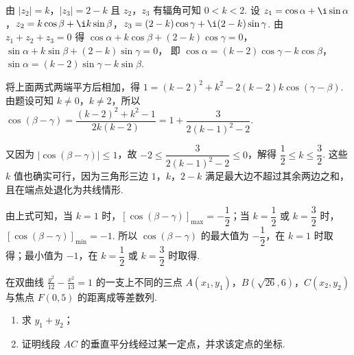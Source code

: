 \begin{solution}
由 \(|z_2|=k\)，\(|z_3|=2-k\) 且 \(z_2\)，\(z_3\) 有辐角可知 \(0<k<2\). 设 \(z_1=\cos\alpha+\i\sin\alpha\)，\(z_2=k\cos\beta+\i k\sin\beta\)，\(z_3=(2-k)\cos\gamma+\i(2-k)\sin\gamma\). 由 \(z_1+z_2+z_3=0\) 得
\(\cos\alpha+k\cos\beta+(2-k)\cos\gamma=0\)，\(\sin\alpha+k\sin\beta+(2-k)\sin\gamma=0\)，
即 \(\cos\alpha=(k-2)\cos\gamma-k\cos\beta\)，\(\sin\alpha=(k-2)\sin\gamma-k\sin\beta\).

将上面两式两端平方后相加，得 \(1=(k-2)^2+k^2-2(k-2)k\cos(\gamma-\beta)\). 由题设可知 \(k\ne0\)，\(k\ne2\)，所以 \(\cos(\beta-\gamma)=\dfrac{(k-2)^2+k^2-1}{2k(k-2)}=1+\dfrac{3}{2(k-1)^2-2}\).

又因为 \(\left| \cos(\beta-\gamma) \right|\leqslant1\)，故 \(-2\leqslant\dfrac{3}{2(k-1)^2-2}\leqslant0\)，解得 \(\dfrac{1}{2}\leqslant k\leqslant\dfrac{3}{2}\). 这些 \(k\) 值也确实可行，因为三角形三边 \(1\)，\(k\)，\(2-k\) 满足最大边不超过其余两边之和，且在端点处退化为共线情形.

由上式可知，当 \(k=1\) 时，\(\left[ \cos(\beta-\gamma) \right]_{\max}=-\dfrac{1}{2}\)；当 \(k=\dfrac{1}{2}\) 或 \(k=\dfrac{3}{2}\) 时，\(\left[ \cos(\beta-\gamma) \right]_{\min}=-1\). 所以 \(\cos(\beta-\gamma)\) 的最大值为 \(-\dfrac{1}{2}\)，在 \(k=1\) 时取得；最小值为 \(-1\)，在 \(k=\dfrac{1}{2}\) 或 \(k=\dfrac{3}{2}\) 时取得.
\end{solution}

\begin{problem}
在双曲线 \(\frac{y^2}{12}-\frac{x^2}{13}=1\) 的一支上不同的三点 \(A(x_1,y_1)\)，\(B(\sqrt{26},6)\)，\(C(x_2,y_2)\) 与焦点 \(F(0,5)\) 的距离成等差数列.

\begin{enumerate}
\item 求 \(y_1+y_2\)；
\item 证明线段 \(AC\) 的垂直平分线经过某一定点，并求该定点的坐标.
\end{enumerate}
\end{problem}

